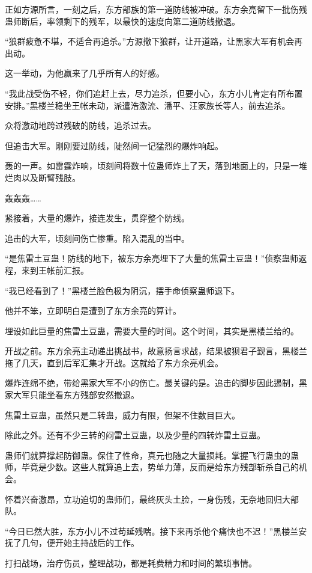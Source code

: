 \begin{this_body}
正如方源所言，一刻之后，东方部族的第一道防线被冲破。东方余亮留下一批伤残蛊师断后，率领剩下的残军，以最快的速度向第二道防线撤退。

“狼群疲惫不堪，不适合再追杀。”方源撤下狼群，让开道路，让黑家大军有机会再出动。

这一举动，为他赢来了几乎所有人的好感。

“我此战受伤不轻，你们追赶上去，尽力追杀，但要小心，东方小儿肯定有所布置安排。”黑楼兰稳坐王帐未动，派遣浩激流、潘平、汪家族长等人，前去追杀。

众将激动地跨过残破的防线，追杀过去。

但追击大军。刚刚要过防线，陡然间一记猛烈的爆炸响起。

轰的一声。如雷霆炸响，顷刻间将数十位蛊师炸上了天，落到地面上的，只是一堆烂肉以及断臂残肢。

轰轰轰……

紧接着，大量的爆炸，接连发生，贯穿整个防线。

追击的大军，顷刻间伤亡惨重。陷入混乱的当中。

“是焦雷土豆蛊！防线的地下，被东方余亮埋下了大量的焦雷土豆蛊！”侦察蛊师返程，来到王帐前汇报。

“我已经看到了！”黑楼兰脸色极为阴沉，摆手命侦察蛊师退下。

他并不笨，立即明白是遭到了东方余亮的算计。

埋设如此巨量的焦雷土豆蛊，需要大量的时间。这个时间，其实是黑楼兰给的。

开战之前。东方余亮主动递出挑战书，故意扬言求战，结果被狈君子觐言，黑楼兰拖了几天，直到后军汇集才开战。这就给了东方余亮机会。

爆炸连绵不绝，带给黑家大军不小的伤亡。最关键的是。追击的脚步因此遏制，黑家大军只能坐看东方残部安然撤退。

焦雷土豆蛊，虽然只是二转蛊，威力有限，但架不住数目巨大。

除此之外。还有不少三转的闷雷土豆蛊，以及少量的四转炸雷土豆蛊。

蛊师们就算撑起防御蛊。保住了性命，真元也随之大量损耗。掌握飞行蛊虫的蛊师，毕竟是少数。这些人就算追上去，势单力薄，反而是给东方残部斩杀自己的机会。

怀着兴奋激昂，立功迫切的蛊师们，最终灰头土脸，一身伤残，无奈地回归大部队。

“今日已然大胜，东方小儿不过苟延残喘。接下来再杀他个痛快也不迟！”黑楼兰安抚了几句，便开始主持战后的工作。

打扫战场，治疗伤员，整理战功，都是耗费精力和时间的繁琐事情。


\end{this_body}
